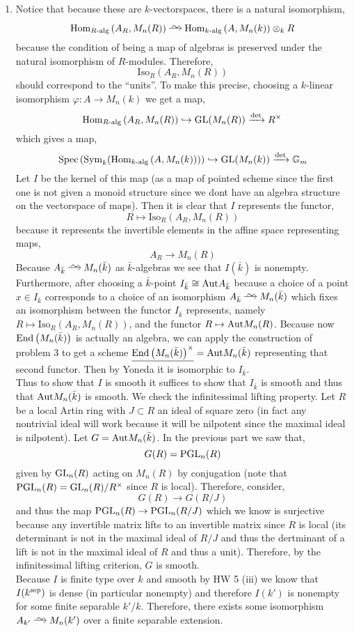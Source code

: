 \documentclass[12pt]{article}
\begin{document}
\begin{enumerate}
\item Notice that because these are $k$-vectorspaces, there is a natural isomorphism,
\[ \Hom{R\text{-alg}}{A_R}{M_n(R)} \iso \Hom{k\text{-alg}}{A}{M_n(k)} \otimes_k R \]
because the condition of being a map of algebras is preserved under the natural isomorphism of $R$-modules. Therefore,
\[ \mathrm{Iso}_R(A_R, M_n(R)) \]
should correspond to the ``units''. To make this precise, choosing a $k$-linear isomorphism $\varphi : A \to M_n(k)$ we get a map,
\[ \mathrm{Hom}_{R\text{-alg}} \left( A_R, M_n(R) \right) \hookrightarrow \mathrm{GL}{(M_n(R))} \xrightarrow{\det} R^\times \]
which gives a map,
\[ \mathrm{Spec}\left( \mathrm{Sym}_{k}\! \left( \mathrm{Hom}_{k\text{-alg}} \left( A, M_n(k) \right) \right) \right) \hookrightarrow \mathrm{GL}(M_n(k)) \xrightarrow{\det} \mathbb{G}_m \]
Let $I$ be the kernel of this map (as a map of pointed scheme since the first one is not given a monoid structure since we dont have an algebra structure on the vectorspace of maps). Then it is clear that $I$ represents the functor,
\[ R \mapsto \mathrm{Iso}_R(A_R, M_n(R)) \]
because it represents the invertible elements in the affine space representing maps,
\[ A_R \to M_n(R) \] 
Because $A_{\bar{k}} \iso M_n(\bar{k})$ as $\bar{k}$-algebras we see that $I(\bar{k})$ is nonempty. Furthermore, after choosing a $\bar{k}$-point $I_{\bar{k}} \cong \mathrm{Aut}{A_{\bar{k}}}$ because a choice of a point $x \in I_{\bar{k}}$ corresponds to a choice of an isomorphism $A_{\bar{k}} \iso M_n(\bar{k})$ which fixes an isomorphism between the functor $I_{\bar{k}}$ represents, namely $R \mapsto \mathrm{Iso}_R(A_R, M_n(R))$, and the functor $R \mapsto \mathrm{Aut}{M_n(R)}$. Because now $\mathrm{End}\left( M_n(\bar{k}) \right)$ is actually an algebra, we can apply the construction of problem 3 to get a scheme $\underline{\mathrm{End}\left( M_n(\bar{k}) \right)^\times} = \mathrm{Aut}{M_n(\bar{k})}$ representing that second functor. Then by Yoneda it is isomorphic to $I_{\bar{k}}$. 
\bigskip\\
Thus to show that $I$ is smooth it suffices to show that $I_{\bar{k}}$ is smooth and thus that $\mathrm{Aut}{M_n(\bar{k})}$ is smooth. We check the infinitessimal lifting property. Let $R$ be a local Artin ring with $J \subset R$ an ideal of square zero (in fact any nontrivial ideal will work because it will be nilpotent since the maximal ideal is nilpotent). Let $G = \mathrm{Aut}{M_n(\bar{k})}$. In the previous part we saw that,
\[ G(R) = \mathrm{PGL}_n(R) \]
given by $\mathrm{GL}_n(R)$ acting on $M_n(R)$ by conjugation (note that $\mathrm{PGL}_n(R) = \mathrm{GL}_n(R) / R^\times$ since $R$ is local). Therefore, consider,
\[ G(R) \to G(R/J) \]
and thus the map $\mathrm{PGL}_n(R) \to \mathrm{PGL}_n(R/J)$ which we know is surjective because any invertible matrix lifts to an invertible matrix since $R$ is local (its determinant is not in the maximal ideal of $R/J$ and thus the dertminant of a lift is not in the maximal ideal of $R$ and thus a unit). Therefore, by the infinitessimal lifting criterion, $G$ is smooth. 
\bigskip\\
Because $I$ is finite type over $k$ and smooth by HW 5 (iii) we know that $I(k^{\mathrm{sep}})$ is dense (in particular nonempty) and therefore $I(k')$ is nonempty for some finite separable $k'/k$. Therefore, there exists some isomorphism $A_{k'} \iso M_n(k')$ over a finite separable extension.



\end{enumerate}
\end{document}
